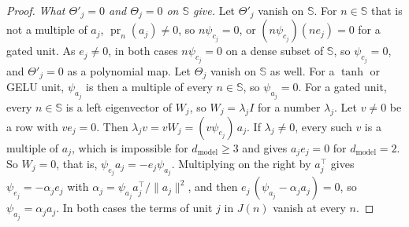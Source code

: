 \documentclass[10pt]{article}
\theoremstyle{definition}
\theoremstyle{remark}
\newcommand{\dm}{d_{\mathrm{model}}}
\newcommand{\norm}[1]{\lVert #1\rVert}
\begin{document}
\begin{proof}
\emph{What $\Theta'_j = 0$ and $\Theta_j = 0$ on $\mathbb S$ give.} Let $\Theta'_j$ vanish on $\mathbb S$. For $n \in \mathbb S$ that is not a multiple of $a_j$, $\operatorname{pr}_n(a_j) \neq 0$, so $n\psi_{c_j} = 0$, or $(n\psi_{c_j})(ne_j) = 0$ for a gated unit. As $e_j \neq 0$, in both cases $n\psi_{c_j} = 0$ on a dense subset of $\mathbb S$, so $\psi_{c_j} = 0$, and $\Theta'_j = 0$ as a polynomial map. Let $\Theta_j$ vanish on $\mathbb S$ as well. For a $\tanh$ or GELU unit, $\psi_{a_j}$ is then a multiple of every $n \in \mathbb S$, so $\psi_{a_j} = 0$. For a gated unit, every $n \in \mathbb S$ is a left eigenvector of $W_j$, so $W_j = \lambda_jI$ for a number $\lambda_j$. Let $v \neq 0$ be a row with $ve_j = 0$. Then $\lambda_jv = vW_j = (v\psi_{e_j})\,a_j$. If $\lambda_j \neq 0$, every such $v$ is a multiple of $a_j$, which is impossible for $\dm \ge 3$ and gives $a_je_j = 0$ for $\dm = 2$. So $W_j = 0$, that is, $\psi_{e_j}a_j = -e_j\psi_{a_j}$. Multiplying on the right by $a_j^\top$ gives $\psi_{e_j} = -\alpha_je_j$ with $\alpha_j = \psi_{a_j}a_j^\top/\norm{a_j}^2$, and then $e_j\,(\psi_{a_j} - \alpha_ja_j) = 0$, so $\psi_{a_j} = \alpha_ja_j$. In both cases the terms of unit $j$ in $J(n)$ vanish at every $n$.


\end{proof}
\end{document}
